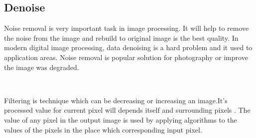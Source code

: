 
\subsection*{Denoise}

Noise removal is very important task in image processing. It will help to remove the noise from the image and rebuild to original image is the best quality. In modern digital image processing, data denoising is a hard problem and it used to application areas. Noise removal is popular solution for photography or improve the image was degraded.

\

Filtering is technique which can be decreasing or increasing an image.It's processed value for current pixel will depends itself and surrounding pixels . The value of any pixel in the output image is used by applying  algorithms to the values of the pixels in the place which corresponding input pixel.

\







 















